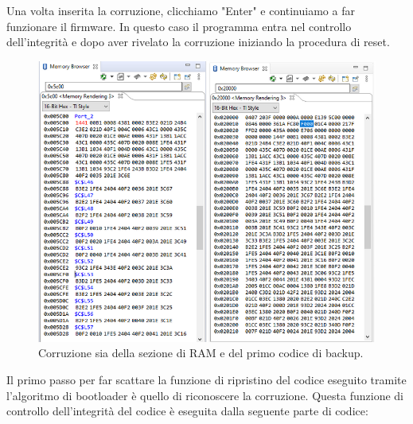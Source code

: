 \documentclass[LaM,binding=0.6cm]{../sapthesis}
\begin{document}
Una volta inserita la corruzione, clicchiamo "Enter" e continuiamo a far funzionare il firmware.
In questo caso il programma entra nel controllo dell'integrità e dopo aver rivelato la corruzione iniziando la procedura di reset.

\begin{figure}[htbp]
\centerline{\includegraphics[scale=0.55]{examples/BootloaderTestCorruzioni2.PNG}}
\caption{Corruzione sia della sezione di RAM e del primo codice di backup.}
\label{fig}
\end{figure}
\newline

Il primo passo per far scattare la funzione di ripristino del codice eseguito tramite l'algoritmo di bootloader è quello di riconoscere la corruzione. Questa funzione di controllo dell'integrità del codice è eseguita dalla seguente parte di codice:
\end{document}
